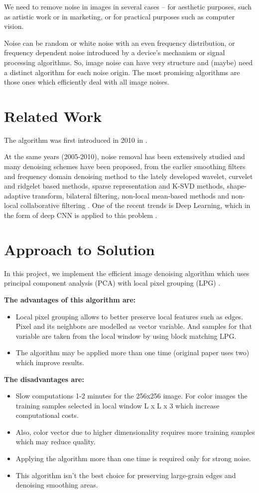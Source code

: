 We need to remove noise in images in several cases – for aesthetic purposes, such as artistic work or in marketing, or for practical purposes such as computer vision.  

Noise can be random or white noise with an even frequency distribution, or frequency dependent noise introduced by a device's mechanism or signal processing algorithms. So, image noise can have very structure and (maybe) need a distinct algorithm for each noise origin. The most promising algorithms are those ones which efficiently deal with all image noises. 

\section{Related Work}
The algorithm was first introduced in 2010 in \cite{zhang2010two}.  

At the same years (2005-2010), noise removal has been extensively studied and many denoising schemes have been proposed, from the earlier smoothing filters and frequency domain denoising method to the lately developed wavelet, curvelet and ridgelet based methods, sparse representation and K-SVD methods, shape-adaptive transform, bilateral filtering, non-local mean-based methods and non-local collaborative filtering \cite{zhang2010two}. One of the recent trends is Deep Learning, which in the form of deep CNN is applied to this problem \cite{zhang2017beyond}. 

\section{Approach to Solution}
In this project, we implement the efficient image denoising algorithm which uses principal component analysis (PCA) with local pixel grouping (LPG) \cite{zhang2010two}. 

\textbf{The advantages of this algorithm are:}
\begin{itemize}
    \item Local pixel grouping allows to better preserve local features such as edges. Pixel and its neighbors are modelled as vector variable. And samples for that variable are taken from the local window by using block matching LPG. 
    \item The algorithm may be applied more than one time (original paper uses two) which improve results. 
\end{itemize}
\textbf{The disadvantages are:}
\begin{itemize}
    \item Slow computations 1-2 minutes for the 256x256 image. For color images the training samples selected in local window L x L x 3 which increase computational costs.
    \item Also, color vector due to higher dimensionality requires more training samples which may reduce quality. 
    \item Applying the algorithm more than one time is required only for strong noise. 
    \item This algorithm isn’t the best choice for preserving large-grain edges and denoising smoothing areas. 
\end{itemize}

